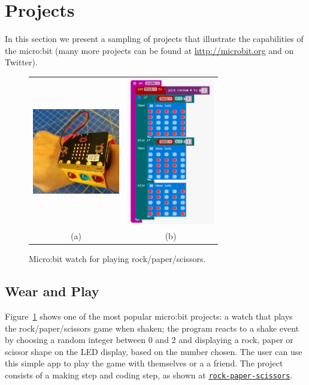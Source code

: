 \section{Projects}
\label{sec:projects}

In this section we present a sampling of projects that 
illustrate the capabilities of the micro:bit (many more projects
can be found at \url{http://microbit.org} and on Twitter).

\begin{figure}[t] 
    \begin{tabular}{cc}
        \includegraphics[width=1.5in]{images/rock-paper-scissors.jpg}  &
        \includegraphics[width=1.5in]{images/rpsBlocks.png} \\
        (a) & (b) 
      \end{tabular}
    \caption{\label{fig:rps}Micro:bit watch for playing rock/paper/scissors.}
\end{figure}

\subsection{Wear and Play}

Figure~\ref{fig:rps} shows one of the most popular micro:bit projects:
a watch that plays the rock/paper/scissors game when shaken; 
the program reacts to a shake event by choosing a random integer between 0 and 2
and displaying a rock, paper or scissor shape on the LED display, based
on the number chosen. The
user can use this simple app to play the game with themselves or a
a friend. The project consists of a making step and coding step,
as shown at
{\tt \href{http://makecode.microbit.org/projects/rock-paper-scissors}{rock-paper-scissors}}.

